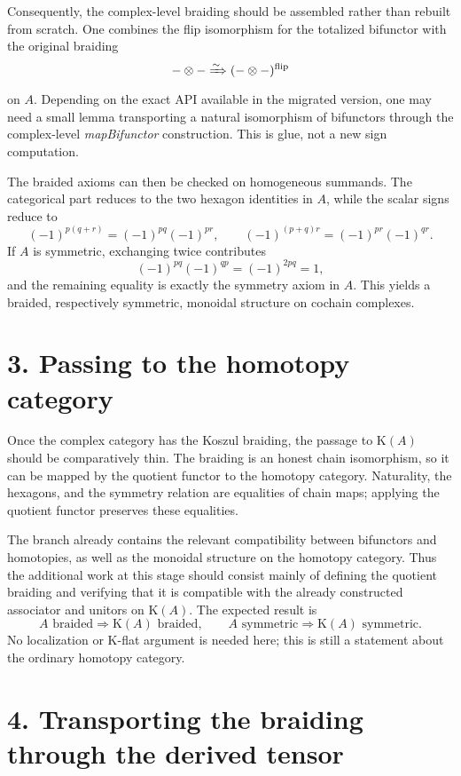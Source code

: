 \documentclass[10pt,a4paper]{article}
\newcommand{\K}{\mathrm K(A)}
\begin{document}
Consequently, the complex-level braiding should be assembled rather than rebuilt from scratch. One combines the flip isomorphism for the totalized bifunctor with the original braiding
\[
  -\otimes- \xRightarrow{\sim} (-\otimes-)^{\mathrm{flip}}
\]
on $A$. Depending on the exact API available in the migrated version, one may need a small lemma transporting a natural isomorphism of bifunctors through the complex-level \emph{mapBifunctor} construction. This is glue, not a new sign computation.

The braided axioms can then be checked on homogeneous summands. The categorical part reduces to the two hexagon identities in $A$, while the scalar signs reduce to
\[
  (-1)^{p(q+r)}=(-1)^{pq}(-1)^{pr},
  \qquad
  (-1)^{(p+q)r}=(-1)^{pr}(-1)^{qr}.
\]
If $A$ is symmetric, exchanging twice contributes
\[
  (-1)^{pq}(-1)^{qp}=(-1)^{2pq}=1,
\]
and the remaining equality is exactly the symmetry axiom in $A$. This yields a braided, respectively symmetric, monoidal structure on cochain complexes.

\section*{3. Passing to the homotopy category}

Once the complex category has the Koszul braiding, the passage to $\K$ should be comparatively thin. The braiding is an honest chain isomorphism, so it can be mapped by the quotient functor to the homotopy category. Naturality, the hexagons, and the symmetry relation are equalities of chain maps; applying the quotient functor preserves these equalities.

The branch already contains the relevant compatibility between bifunctors and homotopies, as well as the monoidal structure on the homotopy category. Thus the additional work at this stage should consist mainly of defining the quotient braiding and verifying that it is compatible with the already constructed associator and unitors on $\K$. The expected result is
\[
  A\text{ braided} \Longrightarrow \K\text{ braided},
  \qquad
  A\text{ symmetric} \Longrightarrow \K\text{ symmetric}.
\]
No localization or K-flat argument is needed here; this is still a statement about the ordinary homotopy category.

\section*{4. Transporting the braiding through the derived tensor}
\end{document}
